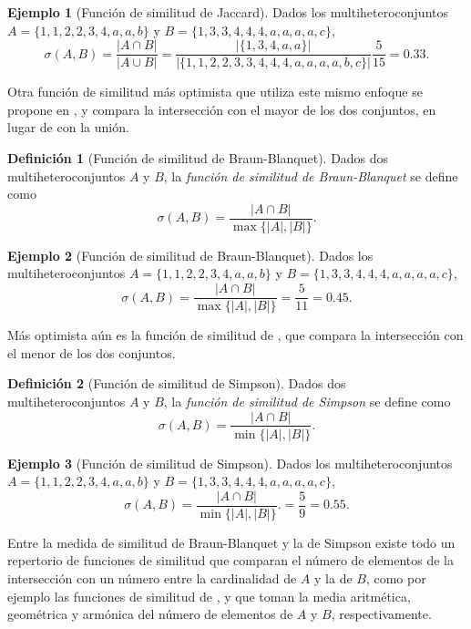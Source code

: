 \documentclass[a4paper,10pt,twoside]{article}
\theoremstyle{definition}
\newtheorem{definition}{Definición}
\newtheorem{example}{Ejemplo}
\begin{document}
\begin{example}[Función de similitud de Jaccard]
Dados los multiheteroconjuntos $A=\{1,1,2,\allowbreak 2,3,4,a,a,b\}$ y $B=\{1,3,3,4,4,4,a,a,a,a,c\}$,
\[
\sigma(A,B)=\frac{|A\cap B|}{|A\cup B|} = \frac{|\{1,3,4,a,a\}|}{|\{1,1,2,2,3,3,4,4,4,a,a,a,a,b,c\}|} \frac{5}{15} = 0.33.
\]
\end{example}

Otra función de similitud más optimista que utiliza este mismo enfoque se propone en \cite{braunblanquet1932plant}, y compara la intersección con el mayor de los dos conjuntos, en lugar de con la unión. 

\begin{definition}[Función de similitud de Braun-Blanquet]
Dados dos multiheteroconjuntos $A$ y $B$, la \emph{función de similitud de Braun-Blanquet} se define como
\[
\sigma(A,B)=\frac{|A\cap B|}{\max\{|A|,|B|\}}.
\]
\end{definition}

\begin{example}[Función de similitud de Braun-Blanquet]
Dados los multiheteroconjuntos $A=\{1,1,2,\allowbreak 2,3,4,a,a,b\}$ y $B=\{1,3,3,4,4,4,a,a,a,a,c\}$,
\[
\sigma(A,B)=\frac{|A\cap B|}{\max\{|A|,|B|\}} = \frac{5}{11} = 0.45.
\]
\end{example}

Más optimista aún es la función de similitud de \cite{simpson1960notes}, que compara la intersección con el menor de los dos conjuntos. 

\begin{definition}[Función de similitud de Simpson]
Dados dos multiheteroconjuntos $A$ y $B$, la \emph{función de similitud de Simpson} se define como
\[
\sigma(A,B)=\frac{|A\cap B|}{\min\{|A|,|B|\}}.
\]
\end{definition}

\begin{example}[Función de similitud de Simpson]
Dados los multiheteroconjuntos $A=\{1,1,2,\allowbreak 2,3,4,a,a,b\}$ y $B=\{1,3,3,4,4,4,a,a,a,a,c\}$,
\[
\sigma(A,B)=\frac{|A\cap B|}{\min\{|A|,|B|\}}. = \frac{5}{9} = 0.55.
\]
\end{example}

Entre la medida de similitud de Braun-Blanquet y la de Simpson existe todo un repertorio de funciones de similitud que comparan el número de elementos de la  intersección con un número entre la cardinalidad de $A$ y la de $B$, como por ejemplo las funciones de similitud de \cite{dice1945measures}, \cite{ochiai1957zoogeographical} y \cite{kulczynski1927pflanzenassoziationen} que toman la media aritmética, geométrica y armónica del número de elementos de $A$ y $B$, respectivamente.
 
\end{document}
